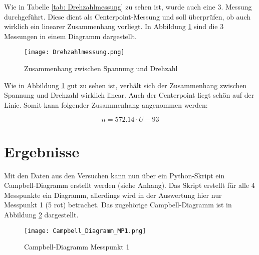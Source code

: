     \noindent
    Wie in Tabelle \ref{tab: Drehzahlmessung} zu sehen ist, wurde auch eine 3.
    Messung durchgeführt. Diese dient als Centerpoint-Messung und soll
    überprüfen, ob auch wirklich ein linearer Zusammenhang vorliegt. In Abbildung
    \ref{fig: Drehzahlmessung} sind die 3 Messungen in einem Diagramm dargestellt.

    \begin{figure}[H]
        \centering
        \texttt{[image: Drehzahlmessung.png]}
        \caption{Zusammenhang zwischen Spannung und Drehzahl}
        \label{fig: Drehzahlmessung}
    \end{figure}

    \noindent
    Wie in Abbildung \ref{fig: Drehzahlmessung} gut zu sehen ist, verhält sich
    der Zusammenhang zwischen Spannung und Drehzahl wirklich linear. Auch der
    Centerpoint liegt schön auf der Linie. Somit kann folgender Zusammenhang
    angenommen werden:

    \begin{equation*}
        n = 572.14 \cdot U - 93
    \end{equation*}

\section{Ergebnisse}
    Mit den Daten aus den Versuchen kann nun über ein Python-Skript ein
    Campbell-Diagramm erstellt werden (siehe Anhang). Das Skript erstellt für
    alle 4 Messpunkte ein Diagramm, allerdings wird in der Auswertung hier nur
    Messpunkt 1 (5 rot) betrachet. Das zugehörige Campbell-Diagramm ist in
    Abbildung \ref{fig: Campbell_Diagramm} dargestellt.

    \begin{figure}[H]
        \centering
        \texttt{[image: Campbell\_Diagramm\_MP1.png]}
        \caption{Campbell-Diagramm Messpunkt 1}
        \label{fig: Campbell_Diagramm}
    \end{figure}

